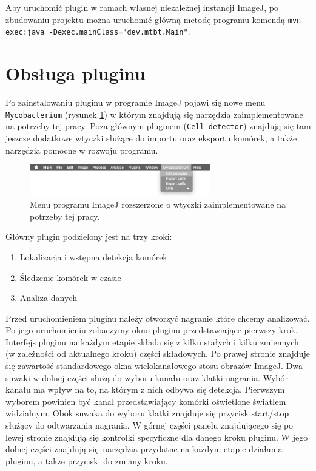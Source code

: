 \documentclass[declaration,shortabstract,mgr]{iithesis}
\begin{document}
Aby uruchomić plugin w ramach własnej niezależnej instancji ImageJ, po zbudowaniu projektu można uruchomić główną metodę programu komendą
\linebreak\texttt{mvn exec:java -Dexec.mainClass="dev.mtbt.Main"}.


\section{Obsługa pluginu}
\label{sec:user-manual}

Po zainstalowaniu pluginu w programie ImageJ pojawi się nowe menu \texttt{Mycobacterium} (rysunek \ref{fig:ui-menu}) w którym znajdują się narzędzia zaimplementowane na potrzeby tej pracy. Poza głównym pluginem (\texttt{Cell detector}) znajdują się tam jeszcze dodatkowe wtyczki służące do importu oraz eksportu komórek, a także narzędzia pomocne w rozwoju programu.
\begin{figure}
  \centering
  \includegraphics[width=0.7\textwidth]{images/ui-menu.png}
  \caption{Menu programu ImageJ rozszerzone o wtyczki zaimplementowane na potrzeby tej pracy.}
  \label{fig:ui-menu}
\end{figure}
Główny plugin podzielony jest na trzy kroki:


\begin{enumerate}
  \item Lokalizacja i wstępna detekcja komórek
  \item Śledzenie komórek w czasie
  \item Analiza danych
\end{enumerate}

Przed uruchomieniem pluginu należy otworzyć nagranie które chcemy analizować. Po jego uruchomieniu zobaczymy okno pluginu przedstawiające pierwszy krok.
Interfejs pluginu na każdym etapie składa się z kilku stałych i kilku zmiennych (w zależności od aktualnego kroku) części składowych.
Po prawej stronie znajduje się zawartość standardowego okna wielokanałowego stosu obrazów ImageJ.
Dwa suwaki w dolnej części służą do wyboru kanału oraz klatki nagrania.
Wybór kanału ma wpływ na to, na którym z nich odbywa się detekcja.
Pierwszym wyborem powinien być kanał przedstawiający komórki oświetlone światłem widzialnym.
Obok suwaka do wyboru klatki znajduje się przycisk start/stop służący do odtwarzania nagrania.
W górnej części panelu znajdującego się po lewej stronie znajdują się kontrolki specyficzne dla danego kroku pluginu. W jego dolnej części znajdują się narzędzia przydatne na każdym etapie działania pluginu, a także przyciski do zmiany kroku.
\end{document}
